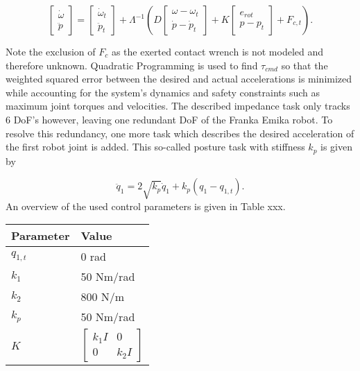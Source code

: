 \documentclass[a4paper, 10pt, conference]{ieeeconf}
\begin{document}
    \begin{equation}
    \begin{bmatrix} \dot{\omega}\\ \ddot{p}\end{bmatrix} = \begin{bmatrix} \dot{\omega}_{t}\\ \ddot{p}_{t}\end{bmatrix} + \Lambda^{-1} \left (  D \begin{bmatrix} {\omega} - {\omega}_{t} \\ \dot{p} - \dot{p}_{t} \end{bmatrix}  + K \begin{bmatrix} e_{rot} \\ {p} - {p}_{t} \end{bmatrix} +F_{c,t} \right ).
    \end{equation}

    Note the exclusion of $F_c$ as the exerted contact wrench is not modeled and therefore unknown. Quadratic Programming is used to find $\tau_{cmd}$ so that the weighted squared error between the desired and actual accelerations is minimized while accounting for the system's dynamics and safety constraints such as maximum joint torques and velocities. The described impedance task only tracks 6 DoF's however, leaving one redundant DoF of the Franka Emika robot. To resolve this redundancy, one more task which describes the desired acceleration of the first robot joint is added. This so-called posture task with stiffness $k_p$ is given by
    
    \begin{equation}
    \ddot{q}_1 = 2\sqrt{k_p}\dot{q}_1+k_p(q_1-q_{1,t}).
    \end{equation}
    An overview of the used control parameters is given in Table xxx.
   
    \begin{table}[h]
    \centering
    \begin{tabular}{l|l}
    \hline
    Parameter & Value                                                \\ \hline
    $q_{1,t}$     & 0 rad                                              \\
    $k_1$     & 50 Nm/rad                                            \\
    $k_2$     & 800 N/m                                              \\
    $k_p$     & 50 Nm/rad                                            \\
    $K$       & $\begin{bmatrix} k_1 I &0 \\ 0 & k_2 I\end{bmatrix}$
    \end{tabular}
    \end{table}
\end{document}
